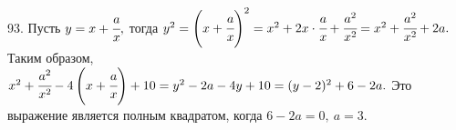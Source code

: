 93. Пусть $y=x+\cfrac{a}{x},$ тогда $y^2=\left(x+\cfrac{a}{x}\right)^2=
x^2+2x\cdot\cfrac{a}{x}+\cfrac{a^2}{x^2}=x^2+\cfrac{a^2}{x^2}+2a.$ Таким образом, $x^2+\cfrac{a^2}{x^2}-4\left(x+\cfrac{a}{x}\right)+10=
y^2-2a-4y+10=(y-2)^2+6-2a.$ Это выражение является полным квадратом, когда
$6-2a=0,\ a=3.$\\
